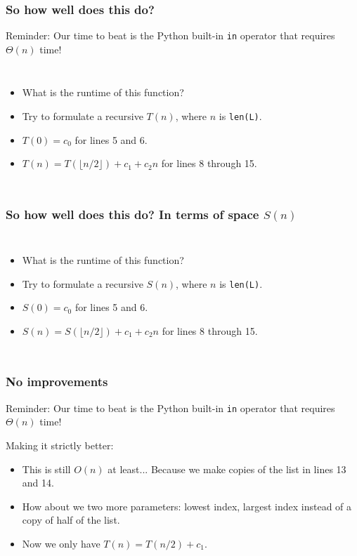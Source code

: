 \begin{frame}
	\frametitle{So how well does this do?}

Reminder: 			Our time to beat is the Python built-in \texttt{in} operator that requires $\Theta(n)$ time!

		\begin{columns}
					
			
				\begin{itemize}
					\item What is the runtime of this function? 
					\item Try to formulate a recursive $T(n)$, where $n$ is \texttt{len(L)}.
					\item $T(0) = c_0$ for lines 5 and 6.
					\item $T(n) = T(\lfloor n/2 \rfloor) + c_1 + c_2n$ for lines 8 through 15.
			\end{itemize}
		\end{columns}
\end{frame}

\begin{frame}
	\frametitle{So how well does this do? In terms of space $S(n)$}

		\begin{columns}
			\column{0.605\linewidth}
				
			\column{0.405\linewidth}
				\begin{itemize}
					\item What is the runtime of this function? 
					\item Try to formulate a recursive $S(n)$, where $n$ is \texttt{len(L)}.
					\item $S(0) = c_0$ for lines 5 and 6.\\
					\item $S(n) = S(\lfloor n/2 \rfloor) + c_1 + c_2n$ for lines 8 through 15.
			\end{itemize}
		\end{columns}
\end{frame}

\begin{frame}
	\frametitle{No improvements}
Reminder:
			Our time to beat is the Python built-in \texttt{in} operator that requires $\Theta(n)$ time!

Making it strictly better:
				\begin{itemize}
					\item This is still $O(n)$ at least... Because we make copies of the list in lines 13 and 14.
					\item How about we two more parameters: lowest index, largest index instead of a copy of half of the list.
					\item Now we only have $T(n) = T(n/2) + c_1$.
		\end{itemize}	
\end{frame}

